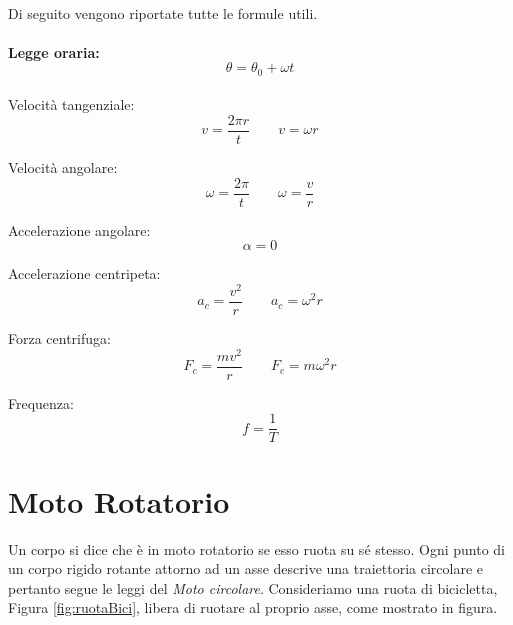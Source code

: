 \paragraph{}
Di seguito vengono riportate tutte le formule utili.
\paragraph{}
\textbf{Legge oraria: }
\begin{equation}
    \theta = \theta_0 + \omega t
\end{equation}
\paragraph{}
Velocità tangenziale:
\begin{equation}
    v = \frac{2\pi r}{t} \qquad v = \omega r
\end{equation}

Velocità angolare:
\begin{equation}
    \omega = \frac{2\pi}{t}\qquad \omega = \frac{v}{r}
\end{equation}

Accelerazione angolare:
\begin{equation}
    \alpha = 0
\end{equation}

Accelerazione centripeta:
\begin{equation}
    a_c = \frac{v^2}{r}\qquad a_c=\omega^2r
    \label{AccelerazioneCentripeta}
\end{equation}

Forza centrifuga:
\begin{equation}
    F_c = \frac{mv^2}{r}\qquad F_c=m\omega^2r
\end{equation}

Frequenza:
\begin{equation}
    f = \frac{1}{T}
\end{equation}



\section{Moto Rotatorio}
Un corpo si dice che è in moto rotatorio se esso ruota su sé stesso.
Ogni punto di un corpo rigido rotante attorno ad un asse descrive una traiettoria circolare e pertanto segue le leggi del \textit{Moto circolare}.
Consideriamo una ruota di bicicletta, Figura \ref{fig:ruotaBici}, libera di ruotare al proprio asse, come mostrato in figura.

